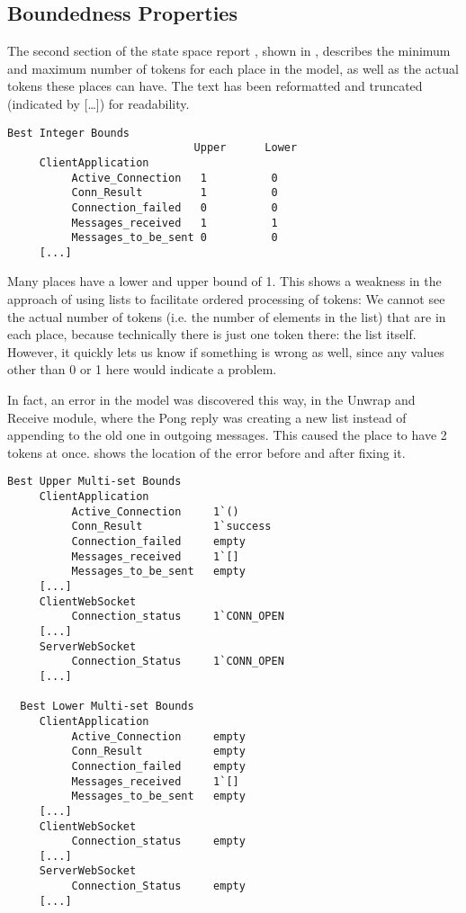 	\subsection{Boundedness Properties}
	The second section of the state space report , shown in ,
	describes the minimum and maximum number of tokens for each place in the model, as well as the actual tokens these places can have.
	The text has been reformatted and truncated (indicated by [\ldots]) for
	readability.
	\begin{lstlisting}[language={},float=h,label=lst:ssa_bib,
	caption=State Space Report: Best Integer Bounds]
    Best Integer Bounds
                             Upper      Lower
     ClientApplication
          Active_Connection   1          0
          Conn_Result         1          0
          Connection_failed   0          0
          Messages_received   1          1
          Messages_to_be_sent 0          0
     [...]
	\end{lstlisting}
	
	Many places have a lower and upper bound of 1. This shows a weakness
	in the approach of using lists to facilitate ordered processing of tokens: We
	cannot see the actual number of tokens (i.e. the number of elements in the
	list) that are in each place, because technically there is just one token
	there: the list itself.
	However, it quickly lets us know if something is wrong as well, since any
	values other than 0 or 1 here would indicate a problem. 
	
	In fact, an error in the model was discovered this way, in the Unwrap and
	Receive module, where the Pong reply was creating a new list instead of
	appending to the old one in outgoing messages. This caused the  place to have 2 tokens at once.  shows the
	location of the error before and after fixing it.
	
	\begin{lstlisting}[language={},tabsize=4,float,label=lst:ssa_bmsb,
	caption=State Space Report: Best Multi-set Bounds]
  Best Upper Multi-set Bounds
     ClientApplication
          Active_Connection		1`()
          Conn_Result			1`success
          Connection_failed		empty
          Messages_received		1`[]
          Messages_to_be_sent	empty
     [...]
     ClientWebSocket
          Connection_status		1`CONN_OPEN
     [...]
     ServerWebSocket
          Connection_Status		1`CONN_OPEN
     [...]

  Best Lower Multi-set Bounds
     ClientApplication
          Active_Connection		empty
          Conn_Result			empty
          Connection_failed		empty
          Messages_received		1`[]
          Messages_to_be_sent	empty
     [...]
     ClientWebSocket
          Connection_status		empty
     [...]
     ServerWebSocket
          Connection_Status		empty
     [...]
	\end{lstlisting}
	
